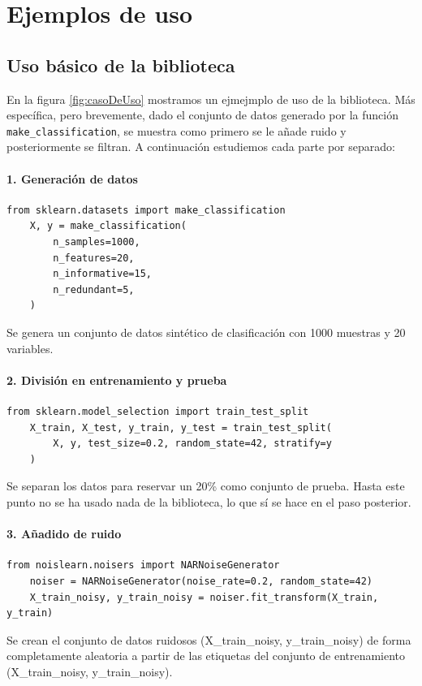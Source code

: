 \documentclass[print, color]{ugrTFG}
\begin{document}
\section{Ejemplos de uso}
 \subsection{Uso básico de la biblioteca}
 En la figura \ref{fig:casoDeUso} mostramos un ejmejmplo de uso de la biblioteca. Más específica, pero brevemente, dado el conjunto de datos generado por la función \texttt{make\_classification}, se muestra como primero se le añade ruido y posteriormente se filtran. A continuación estudiemos cada parte por separado: 

 \paragraph{1. Generación de datos}
 \begin{lstlisting}[style=mystyle]
    from sklearn.datasets import make_classification
    X, y = make_classification(
        n_samples=1000,
        n_features=20,
        n_informative=15,
        n_redundant=5,
    )
 \end{lstlisting}  
 Se genera un conjunto de datos sintético de clasificación con 1000 muestras y 20 variables.
 
 \paragraph{2. División en entrenamiento y prueba}
 \begin{lstlisting}[style=mystyle]
    from sklearn.model_selection import train_test_split
    X_train, X_test, y_train, y_test = train_test_split(
        X, y, test_size=0.2, random_state=42, stratify=y
    )
 \end{lstlisting}
 Se separan los datos para reservar un 20\% como conjunto de prueba. Hasta este punto no se ha usado nada de la biblioteca, lo que sí se hace en el paso posterior.
    
 \paragraph{3. Añadido de ruido}
 \begin{lstlisting}[style=mystyle]
    from noislearn.noisers import NARNoiseGenerator
    noiser = NARNoiseGenerator(noise_rate=0.2, random_state=42)
    X_train_noisy, y_train_noisy = noiser.fit_transform(X_train, y_train)
 \end{lstlisting}
 Se crean el conjunto de datos ruidosos (X\_train\_noisy, y\_train\_noisy) de forma completamente aleatoria a partir de las etiquetas del conjunto de entrenamiento (X\_train\_noisy, y\_train\_noisy).
    
\end{document}
